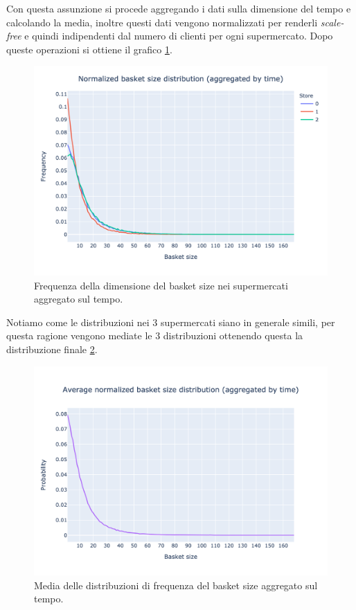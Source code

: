 Con questa assunzione si procede aggregando i dati sulla dimensione del tempo e calcolando la media, inoltre questi dati vengono normalizzati per renderli \textit{scale-free} e quindi indipendenti dal numero di clienti per ogni supermercato. Dopo queste operazioni si ottiene il grafico \ref{fig:store_basket_size}.

\begin{figure}[H]
	\centering
	\includegraphics[width=14cm]{"images/basket_size_dist.png"}
	\caption{Frequenza della dimensione del basket size nei supermercati aggregato sul tempo.}
	\label{fig:store_basket_size}
\end{figure}

Notiamo come le distribuzioni nei 3 supermercati siano in generale simili, per questa ragione vengono mediate le 3 distribuzioni ottenendo questa la distribuzione finale \ref{fig:avg_basket_size}.

\begin{figure}[H]
	\centering
	\includegraphics[width=14cm]{"images/basket_size_dist_avg.png"}
	\caption{Media delle distribuzioni di frequenza del basket size aggregato sul tempo.}
	\label{fig:avg_basket_size}
\end{figure}


